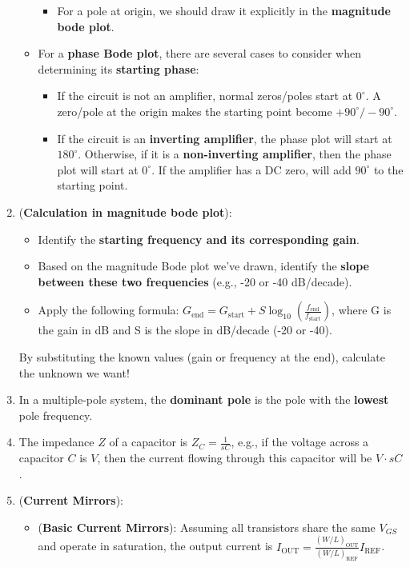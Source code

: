 \documentclass[10pt, landscape]{article}
\begin{document}
\begin{multicols}{4}
\begin{enumerate}
\begin{itemize}
\begin{itemize}
            \item For a pole at origin, we should draw it explicitly in the \textbf{magnitude bode plot}.
        \end{itemize}
        \item For a \textbf{phase Bode plot}, there are several cases to consider when determining its \textbf{starting phase}:
        \begin{itemize}
            \item If the circuit is not an amplifier, normal zeros/poles start at $0^\circ$. A zero/pole at the origin makes the starting point become $+90^\circ/-90^\circ$.
            \item If the circuit is an \textbf{inverting amplifier}, the phase plot will start at $180^\circ$. Otherwise, if it is a \textbf{non-inverting amplifier}, then the phase plot will start at $0^\circ$. If the amplifier has a DC zero, will add $90^\circ$ to the starting point.
        \end{itemize}
    \end{itemize}
    \item (\textbf{Calculation in magnitude bode plot}):
    \begin{itemize}
        \item Identify the \textbf{starting frequency and its corresponding gain}.
        \item Based on the magnitude Bode plot we've drawn, identify the \textbf{slope between these two frequencies} (e.g., -20 or -40 dB/decade).
        \item Apply the following formula: $G_{\text{end}}=G_{\text{start}}+S\log_{10}\left(\frac{f_{\text{end}}}{f_{\text{start}}}\right)$, where G is the gain in dB and S is the slope in dB/decade (-20 or -40).
    \end{itemize}
    By substituting the known values (gain or frequency at the end), calculate the unknown we want!
    \item In a multiple-pole system, the \textbf{dominant pole} is the pole with the \textbf{lowest} pole frequency.
    \item The impedance $Z$ of a capacitor is $Z_C=\frac{1}{sC}$, e.g., if the voltage across a capacitor $C$ is $V$, then the current flowing through this capacitor will be $V\cdot sC$.
    \item (\textbf{Current Mirrors}):
    \begin{itemize}
        \item (\textbf{Basic Current Mirrors}): Assuming all transistors share the same $V_{GS}$ and operate in saturation, the output current is $I_{\text{OUT}}=\frac{(W/L)_{\text{OUT}}}{(W/L)_{\text{REF}}}I_{\text{REF}}$.

\end{itemize}
\end{enumerate}
\end{multicols}
\end{document}
